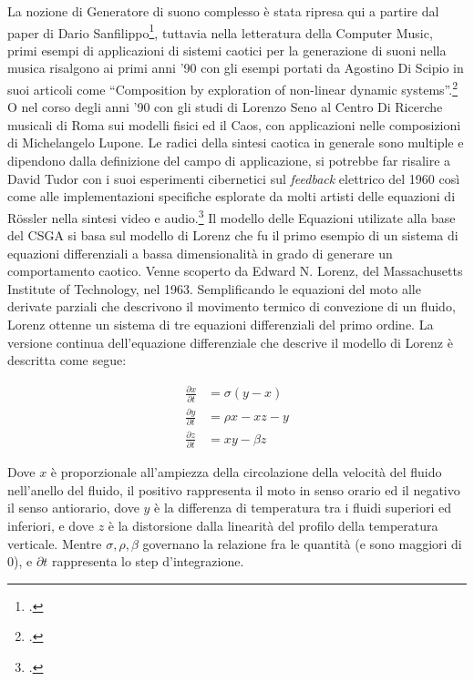 La nozione di Generatore di suono complesso è stata ripresa qui a partire dal
paper di Dario Sanfilippo\footcite{sanfilippo_constrained_2021},
tuttavia nella letteratura della Computer Music, primi esempi di applicazioni
di sistemi caotici per la generazione di suoni nella musica risalgono
ai primi anni '90 con gli esempi portati da Agostino Di Scipio
in suoi articoli come “Composition by exploration of non-linear dynamic systems”.\footcite{discipioiterated}
O nel corso degli anni '90 con gli studi di Lorenzo Seno al Centro Di Ricerche musicali
di Roma sui modelli fisici ed il Caos, con applicazioni nelle composizioni di Michelangelo Lupone.
Le radici della sintesi caotica in generale sono multiple e dipendono
dalla definizione del campo di applicazione, si potrebbe far risalire
a David Tudor con i suoi esperimenti cibernetici sul \emph{feedback} elettrico del 1960
così come alle implementazioni specifiche esplorate da molti artisti
delle equazioni di Rössler nella sintesi video e audio.\footcite{tom_mudd_gutter_synthesis}
Il modello delle Equazioni utilizate alla base del CSGA si basa sul modello di Lorenz 
che fu il primo esempio di un sistema di equazioni differenziali a bassa
dimensionalità in grado di generare un comportamento caotico.
Venne scoperto da Edward N. Lorenz, del Massachusetts Institute of Technology, nel 1963.
Semplificando le equazioni del moto alle derivate parziali che descrivono il movimento termico di
convezione di un fluido, Lorenz ottenne un sistema di tre equazioni differenziali del primo ordine.
La versione continua dell’equazione differenziale che descrive il modello di Lorenz è descritta come segue: 

\begin{align*}
\frac{\partial x}{\partial t} & = \sigma(y-x) \\
\frac{\partial y}{\partial t} & = \rho x - xz - y \\
\frac{\partial z}{\partial t} & = xy -\beta z 
\end{align*}

Dove \( x \) è proporzionale all’ampiezza della circolazione della velocità del fluido nell’anello del fluido,
il positivo rappresenta il moto in senso orario ed il negativo il senso antiorario,
dove \( y \) è la differenza di temperatura tra i fluidi superiori ed inferiori,
e dove \( z \) è la distorsione dalla linearità del profilo della temperatura verticale.
Mentre \( \sigma,  \rho,  \beta \) governano la relazione fra le quantità (e sono maggiori di 0),
e \( \partial t \) rappresenta lo step d'integrazione. 

